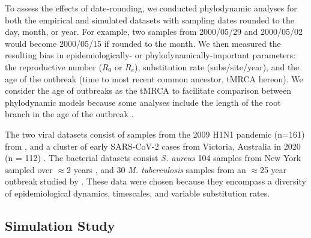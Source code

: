 \documentclass[12pt]{article}
\begin{document}
\begin{spacing}{2}
To assess the effects of date-rounding, we conducted phylodynamic analyses for both the empirical and simulated datasets with sampling dates rounded to the day, month, or year. For example, two samples from 2000/05/29 and 2000/05/02 would become 2000/05/15 if rounded to the month. We then measured the resulting bias in epidemiologically- or phylodynamically-important parameters: the reproductive number ($R_0$ or $R_e$), substitution rate (subs/site/year), and the age of the outbreak (time to most recent common ancestor, tMRCA hereon). We consider the age of outbreaks as the tMRCA to facilitate comparison between phylodynamic models because some analyses include the length of the root branch in the age of the outbreak \citep{stadler2012estimating}.

The two viral datasets consist of samples from the 2009 H1N1 pandemic (n=161) from \citet{hedge_2013_real-time}, and a cluster of early SARS-CoV-2 cases from  Victoria, Australia in 2020 (n = 112) \citep{lane2021genomics}. The bacterial datasets consist \textit{S. aureus} 104 samples from New York sampled over $\approx$2 years \citep{duchene_2016_genome,volz_modeling_2018,uhlemann_molecular_2014}, and 30 \textit{M. tuberculosis} samples from an $\approx$25 year outbreak studied by \citet{kuhnert_tuberculosis_2018}. These data were chosen because they encompass a diversity of epidemiological dynamics, timescales, and variable substitution rates.

\subsection*{Simulation Study}


\end{spacing}
\end{document}
